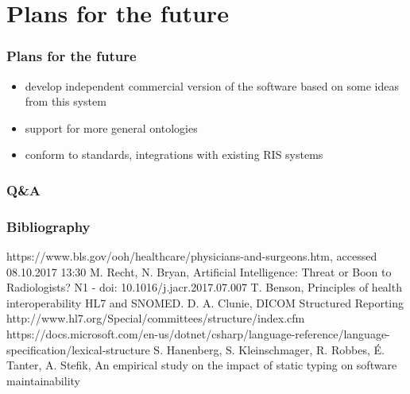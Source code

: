 \documentclass{beamer}
\begin{document}
\section {Plans for the future}
\begin{frame}
\frametitle{Plans for the future}
\begin{itemize}
	\item develop independent commercial version of the software based on some ideas from this system
	\item support for more general ontologies
	\item conform to standards, integrations with existing RIS systems
\end{itemize}
\end{frame}

\begin{frame}
\frametitle{Q\&A}
\end{frame}
\begin{frame}

\frametitle{Bibliography}
\begin{thebibliography}{11}
	 https://www.bls.gov/ooh/healthcare/physicians-and-surgeons.htm, accessed 08.10.2017 13:30
	 M. Recht, N. Bryan, Artificial Intelligence: Threat or Boon to Radiologists?
	N1  - doi: 10.1016/j.jacr.2017.07.007
	 T. Benson, Principles of health interoperability HL7 and SNOMED.
	 D. A. Clunie, DICOM Structured Reporting
	 http://www.hl7.org/Special/committees/structure/index.cfm 
	https://docs.microsoft.com/en-us/dotnet/csharp/language-reference/language-specification/lexical-structure
	S. Hanenberg, S. Kleinschmager, R. Robbes, É. Tanter, A. Stefik, An empirical study on the impact of static typing on software maintainability

\end{thebibliography}
\end{frame}
\end{document}

